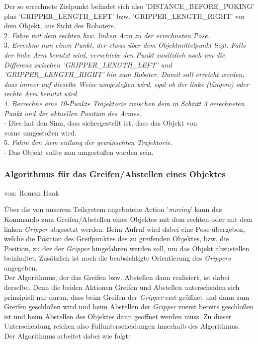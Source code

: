 \documentclass{suturo}
\makeatletter
\newcommand{\chapterauthor}[1]{%
  {\parindent0pt\vspace*{-27pt}%
  \linespread{0}\small\begin{flushright}von: #1\end{flushright}%
  \par\nobreak\vspace*{0pt}}
  \@afterheading%
}
\makeatother
\begin{document}
Der so errechnete Zielpunkt befindet sich also 'DISTANCE\_BEFORE\_POKING' plus 'GRIPPER\_LENGTH\_LEFT' bzw. 'GRIPPER\_LENGTH\_RIGHT' vor dem Objekt, aus Sicht des Roboters.\\

2. \textit{Fahre mit dem rechten bzw. linken Arm zu der errechneten Pose.}\\

3. \textit{Errechne nun einen Punkt, der etwas über dem Objektmittelpunkt liegt. Falls der linke Arm benutzt wird, verschiebe den Punkt zusätzlich noch um die Differenz zwischen 'GRIPPER\_LENGTH\_LEFT' und 'GRIPPER\_LENGTH\_RIGHT' hin zum Roboter. Damit soll erreicht werden, dass immer auf dieselbe Weise umgestoßen wird, egal ob der linke (längere) oder rechte Arm benutzt wird.}\\

4. \textit{Berrechne eine 10-Punkte Trajektorie zwischen dem in Schritt 3 errechneten Punkt und der aktuellen Position des Armes.}\\
\tab - Dies hat den Sinn, dass sichergestellt ist, dass das Objekt von\\ \tab vorne umgestoßen wird.\\

5. \textit{Fahre den Arm entlang der gewünschten Trajektorie.}\\
\tab - Das Objekt sollte nun umgestoßen worden sein.


\subsubsection{Algorithmus für das Greifen/Abstellen eines Objektes}
\chapterauthor{Roman Haak}
Über die von unserem Teilsystem angebotene Action '\textit{moving}' kann das Kommando zum Greifen/Abstellen eines Objektes mit dem rechten oder mit dem linken \textit{Gripper} abgesetzt werden. Beim Aufruf wird dabei eine Pose übergeben, welche die Position des Greifpunktes des zu greifenden Objektes, bzw. die Position, zu der der \textit{Gripper} hingefahren werden soll, um das Objekt abzustellen beinhaltet. Zusätzlich ist noch die beabsichtigte Orientierung des \textit{Grippers} angegeben. \\Der Algorithmus, der das Greifen bzw. Abstellen dann realisiert, ist dabei derselbe. Denn die beiden Aktionen Greifen und Abstellen unterscheiden sich prinzipiell nur daran, dass beim Greifen der \textit{Gripper} erst geöffnet und dann zum Greifen geschloßen wird und beim Abstellen der \textit{Gripper} zuerst bereits geschloßen ist und beim Abstellen des Objektes dann geöffnet werden muss. Zu dieser Unterscheidung reichen also Fallunterscheidungen innerhalb des Algorithmus. \\Der Algorithmus arbeitet dabei wie folgt:\\
\end{document}
